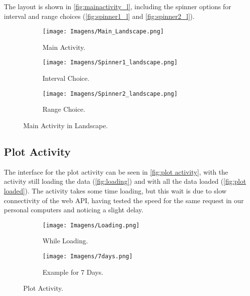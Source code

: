 \documentclass{article}
\begin{document}
The layout is shown in \autoref{fig:mainactivity_l}, including the spinner options for interval and range choices (\autoref{fig:spinner1_l} and \autoref{fig:spinner2_l}).

\begin{figure}[ht]
    \centering
    \begin{subfigure}[t]{0.8\textwidth} 
        \centering
        \texttt{[image: Imagens/Main\_Landscape.png]}
        \caption{Main Activity.}
        \label{fig:mainactivity_l}
    \end{subfigure}

    \vspace{1em} 

    \begin{subfigure}[t]{0.8\textwidth}
        \centering
        \texttt{[image: Imagens/Spinner1\_landscape.png]}
        \caption{Interval Choice.}
        \label{fig:spinner1_l}
    \end{subfigure}

    \vspace{1em} 

    \begin{subfigure}[t]{0.8\textwidth}
        \centering
        \texttt{[image: Imagens/Spinner2\_landscape.png]}
        \caption{Range Choice.}
        \label{fig:spinner2_l}
    \end{subfigure}

    \caption{Main Activity in Landscape.}
    \label{fig:whole_main_activity}
\end{figure}

\subsection{Plot Activity}
The interface for the plot activity can be seen in \autoref{fig:plot activity}, with the activity still loading the data (\autoref{fig:loading}) and with all the data loaded (\autoref{fig:plot loaded}).
The activity takes some time loading, but this wait is due to slow connectivity of the web API, having tested the speed for the same request in our personal computers and noticing a slight delay.

\begin{figure}[ht]
    \centering
    
    \begin{subfigure}[t]{0.49\textwidth}
        \centering
        \texttt{[image: Imagens/Loading.png]}
        \caption{While Loading.}
        \label{fig:loading}
    \end{subfigure}
    \hfill
    \begin{subfigure}[t]{0.49\textwidth}
        \centering
        \texttt{[image: Imagens/7days.png]}
        \caption{Example for 7 Days.}
        \label{fig:plot loaded}
    \end{subfigure}

    \caption{Plot Activity.}
    \label{fig:plot activity}
\end{figure}
\end{document}
